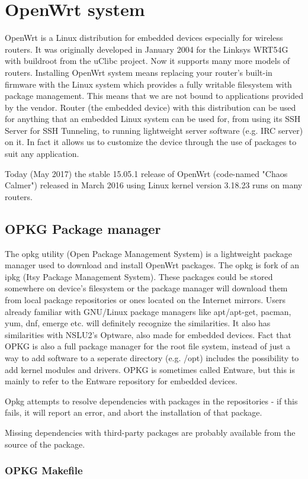 \documentclass[../xdudla00-porting-Tang-to-Open-WRT.tex]{subfiles}
\begin{document}
\chapter{OpenWrt system}\label{owrt}
OpenWrt is a Linux distribution for embedded devices especially for wireless routers.
It was originally developed in January 2004 for the Linksys WRT54G with buildroot from the uClibc project.
Now it supports many more models of routers. 
Installing OpenWrt system means replacing your router’s built-in firmware with the Linux system which provides a fully writable filesystem with package management. 
This means that we are not bound to applications provided by the vendor.
Router (the embedded device) with this distribution can be used for anything that an embedded Linux system can be used for, from using its SSH Server for SSH Tunneling, to running lightweight server software (e.g. IRC server) on it. 
In fact it allows us to customize the device through the use of packages to suit any application.

Today (May 2017) the stable 15.05.1 release of OpenWrt (code-named "Chaos Calmer") released in March 2016 using Linux kernel version 3.18.23 runs on many routers.

\section{OPKG Package manager}

The opkg utility (Open Package Management System) is a lightweight package manager used to download and install OpenWrt packages.
The opkg is fork of an ipkg (Itsy Package Management System).
These packages could be stored somewhere on device's filesystem or the package manager will download them from local package repositories or ones located on the Internet mirrors. 
Users already familiar with GNU/Linux package managers like apt/apt-get, pacman, yum, dnf, emerge etc. will definitely recognize the similarities.
It also has similarities with NSLU2's Optware, also made for embedded devices.
Fact that OPKG is also a full package manager for the root file system, instead of just a way to add software to a seperate directory (e.g. /opt) includes the possibility to add kernel modules and drivers.
OPKG is sometimes called Entware, but this is mainly to refer to the Entware repository for embedded devices.

Opkg attempts to resolve dependencies with packages in the repositories - if this fails, it will report an error, and abort the installation of that package.

Missing dependencies with third-party packages are probably available from the source of the package.

\subsection{OPKG Makefile}
\end{document}
